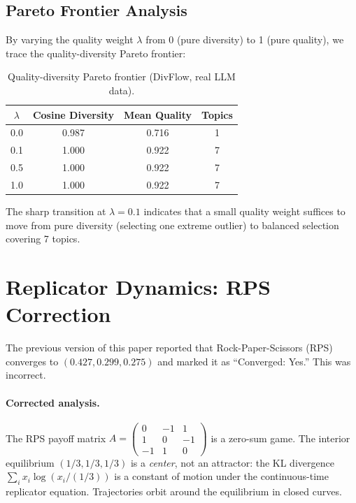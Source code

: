 \documentclass[10pt]{article}
\begin{document}
\subsection{Pareto Frontier Analysis}

By varying the quality weight $\lambda$ from 0 (pure diversity) to 1 (pure quality), we trace the quality-diversity Pareto frontier:

\begin{table}[H]
\centering
\caption{Quality-diversity Pareto frontier (DivFlow, real LLM data).}
\label{tab:pareto}
\begin{tabular}{cccc}
\toprule
$\lambda$ & \textbf{Cosine Diversity} & \textbf{Mean Quality} & \textbf{Topics} \\
\midrule
0.0 & 0.987 & 0.716 & 1 \\
0.1 & 1.000 & 0.922 & 7 \\
0.5 & 1.000 & 0.922 & 7 \\
1.0 & 1.000 & 0.922 & 7 \\
\bottomrule
\end{tabular}
\end{table}

The sharp transition at $\lambda = 0.1$ indicates that a small quality weight suffices to move from pure diversity (selecting one extreme outlier) to balanced selection covering 7 topics.

\section{Replicator Dynamics: RPS Correction}
\label{app:rps}

The previous version of this paper reported that Rock-Paper-Scissors (RPS) converges to $(0.427, 0.299, 0.275)$ and marked it as ``Converged: Yes.''
This was incorrect.

\paragraph{Corrected analysis.}
The RPS payoff matrix $A = \begin{pmatrix} 0 & -1 & 1 \\ 1 & 0 & -1 \\ -1 & 1 & 0 \end{pmatrix}$ is a zero-sum game.
The interior equilibrium $(1/3, 1/3, 1/3)$ is a \emph{center}, not an attractor: the KL divergence $\sum_i x_i \log(x_i / (1/3))$ is a constant of motion under the continuous-time replicator equation.
Trajectories orbit around the equilibrium in closed curves.
\end{document}
